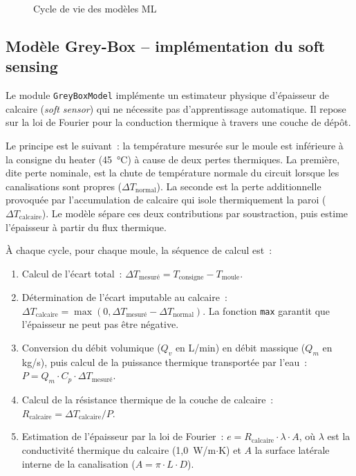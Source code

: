 \begin{figure}[htbp]
  \centering
  \caption{Cycle de vie des modèles ML}
  \label{fig:lifecycle}
\end{figure}

\subsection{Modèle Grey-Box -- implémentation du soft sensing}

Le module \texttt{GreyBoxModel} implémente un estimateur physique d'épaisseur de calcaire (\emph{soft sensor}) qui ne nécessite pas d'apprentissage automatique. Il repose sur la loi de Fourier pour la conduction thermique à travers une couche de dépôt.

Le principe est le suivant~: la température mesurée sur le moule est inférieure à la consigne du heater (45~\si{\celsius}) à cause de deux pertes thermiques. La première, dite perte nominale, est la chute de température normale du circuit lorsque les canalisations sont propres (\( \Delta T_{\text{normal}} \)). La seconde est la perte additionnelle provoquée par l'accumulation de calcaire qui isole thermiquement la paroi (\( \Delta T_{\text{calcaire}} \)). Le modèle sépare ces deux contributions par soustraction, puis estime l'épaisseur à partir du flux thermique.

À chaque cycle, pour chaque moule, la séquence de calcul est~:

\begin{enumerate}
  \item Calcul de l'écart total~: \(\Delta T_{\text{mesuré}} = T_{\text{consigne}} - T_{\text{moule}}\).
  \item Détermination de l'écart imputable au calcaire~: \(\Delta T_{\text{calcaire}} = \max(0, \Delta T_{\text{mesuré}} - \Delta T_{\text{normal}})\). La fonction \texttt{max} garantit que l'épaisseur ne peut pas être négative.
  \item Conversion du débit volumique (\(Q_v\) en L/min) en débit massique (\(Q_m\) en kg/s), puis calcul de la puissance thermique transportée par l'eau~: \(P = Q_m \cdot C_p \cdot \Delta T_{\text{mesuré}}\).
  \item Calcul de la résistance thermique de la couche de calcaire~: \(R_{\text{calcaire}} = \Delta T_{\text{calcaire}} / P\).
  \item Estimation de l'épaisseur par la loi de Fourier~: \(e = R_{\text{calcaire}} \cdot \lambda \cdot A\), où \(\lambda\) est la conductivité thermique du calcaire (1,0~W/m\(\cdot\)K) et \(A\) la surface latérale interne de la canalisation (\(A = \pi \cdot L \cdot D\)).
\end{enumerate}

